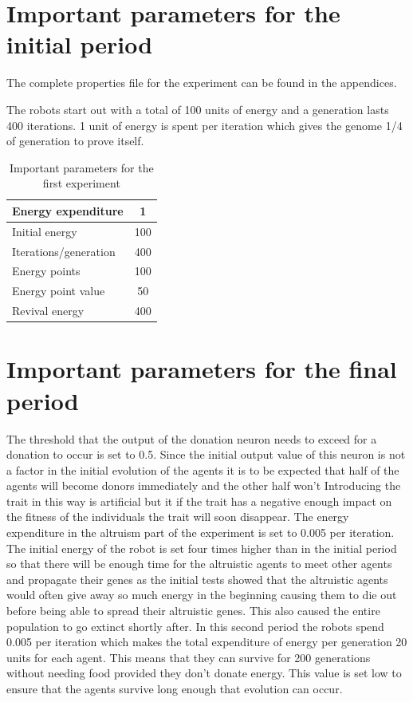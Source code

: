 \documentclass[a4paper]{book}
\begin{document}
\section{Important parameters for the initial period }

The complete properties file for the experiment can be found in the appendices. 

The robots start out with a total of 100 units of energy and a generation lasts 400 iterations.
1 unit of energy is spent per iteration which gives the genome 1/4 of generation to prove itself.


\begin{table}[H]
\begin{center}
\begin{tabular}{|l|c|}\hline
Energy expenditure    &  1 \\\hline\hline
Initial energy 		& 100 \\\hline\hline
Iterations/generation & 400 \\\hline\hline
Energy points & 100 \\\hline\hline
Energy point value & 50 \\\hline\hline
Revival energy & 400 \\\hline\hline
\end{tabular}
\end{center}
\label{table:parameteres}
\caption{Important parameters for the first experiment}
\end{table}
  
\section{Important parameters for the final period}


The threshold that the output of the donation neuron needs to exceed for a donation to occur is set to 0.5.
Since the initial output value of this neuron is not a factor in the initial evolution of the agents it is to be expected that half of the agents will become donors immediately and the other half won't 
Introducing the trait in this way is artificial but it if the trait has a negative enough impact on the fitness of the individuals the trait will soon disappear. 
The energy expenditure in the altruism part of the experiment is set to 0.005 per iteration. 
The initial energy of the robot is set four times higher than in the initial period so that there will be enough time for the altruistic agents to meet other agents and propagate their genes as the initial tests showed that the altruistic agents would often give away so much energy in the beginning causing them to die out before being able to spread their altruistic genes.
This also caused the entire population to go extinct shortly after.
In this second period the robots spend 0.005 per iteration which makes the total expenditure of energy per generation 20 units for each agent. This means that they can survive for 200 generations without needing food provided they don't donate energy. 
This value is set low to ensure that the agents survive long enough that evolution can occur. 
\end{document}
